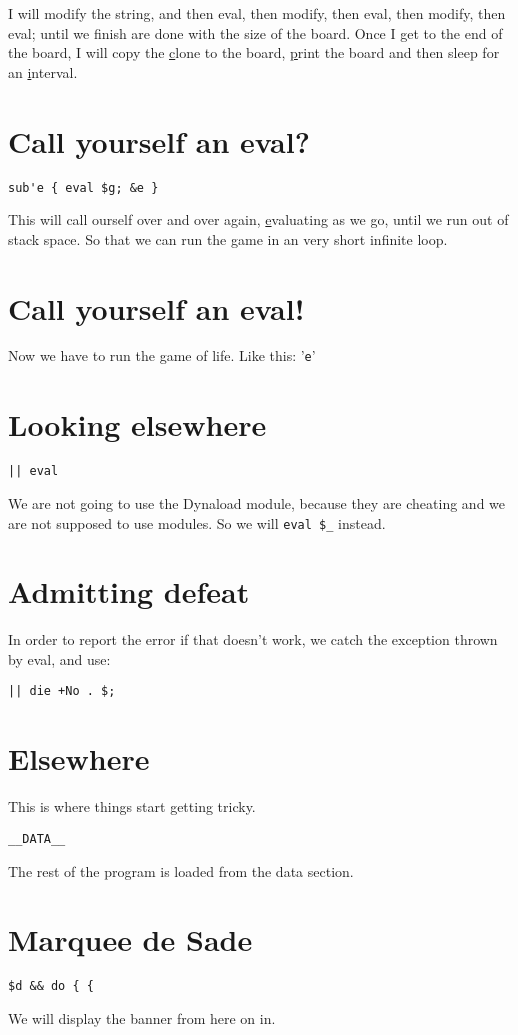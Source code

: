 \documentclass{article}
\begin{document}
I will modify the string, and then eval, then modify, then eval, then
modify, then eval; until we finish are done with the size of the board.  
Once I get to the end of the board, 
I will copy the \underline{c}lone to the board, \underline{p}rint the board 
and then sleep for an \underline{i}nterval.

\section{Call yourself an eval?}
\begin{verbatim}
sub'e { eval $g; &e }
\end{verbatim}
This will call ourself over and over again, \underline{e}valuating as we
go, until we run out of stack
space.  So that we can run the game in an very short infinite loop.

\section{Call yourself an eval!}
Now we have to run the game of life.  Like this: '\verb"e"'

\section{Looking elsewhere}
\begin{verbatim}
|| eval
\end{verbatim}
We are not going to use the Dynaload module, because they are cheating
and we are not supposed to use modules.  So we will \verb"eval $_" instead.  

\section{Admitting defeat}
In order to report the error if that doesn't work, we catch the
exception thrown by eval, and use:
\begin{verbatim}
|| die +No . $;
\end{verbatim}

\section{Elsewhere}
This is where things start getting tricky.
\begin{verbatim}
__DATA__
\end{verbatim}
The rest of the program is loaded from the data section.

\section{Marquee de Sade}
\begin{verbatim}
$d && do { {
\end{verbatim}
We will display the banner from here on in.
\end{document}
